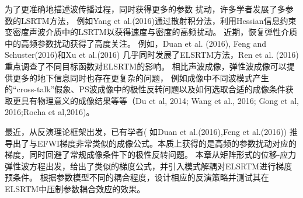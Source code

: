 为了更准确地描述波传播过程，同时获得更多的参数
扰动，许多学者发展了多参数的LSRTM方法，
例如Yang et
al.(2016)\cite{Yang2016}通过散射积分法，利用Hessian信息约束变密度声波介质中的LSRTM以获得速度与密度的高频扰动。
近期，恢复弹性介质中的高频参数扰动获得了高度关注。
例如，Duan et al. (2016)\cite{Duan2016}, Feng and Schuster(2016)\cite{Feng2016}和Xu et al.(2016)
\cite{Xu2016}几乎同时发展了ELSRTM方法，Ren et al. (2016)\cite{RenEtAl2016}重点调查了不同目标函数对ELSRTM的影响。
相比声波成像，弹性波成像可以提供更多的地下信息同时也存在更复杂的问题，
例如成像中不同波模式产生的“cross-talk”假象、PS波成像中的极性反转问题以及如何选取合适的成像条件获取更具有物理意义的成像结果等等（Du et al,
2014\cite{DuEtAl2014}; Wang et al.,
2016\cite{wang2016scalar}; Gong et
al, 2016\cite{GongEtAl2016};Rocha et al,2016\cite{RochaEtAl2016a})。

最近，从反演理论框架出发，已有学者(
如Duan et al.(2016)\cite{Duan2016},Feng et
al.(2016)\cite{Feng2016})
推导出了与EFWI梯度非常类似的成像公式。本质上获得的是高频的参数扰动对应的梯度，同时回避了常规成像条件下的极性反转问题。
本章从矩阵形式的位移-应力弹性波方程出发，给出了类似的梯度公式，并引入模式解耦对ELSRTM进行梯度预条件。
根据参数模型不同的耦合程度，设计相应的反演策略并测试其在ELSRTM中压制参数耦合效应的效果。
